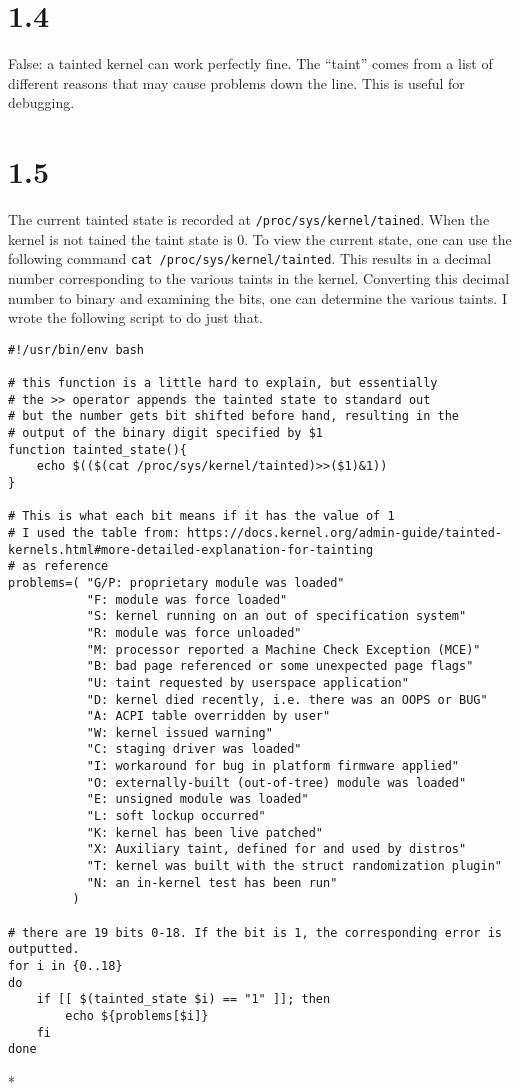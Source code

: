 \documentclass[11pt]{article}
\author{David Lewis}
\date{\today}
\title{}
\begin{document}
\tableofcontents

\section{1.4}
\label{sec:orgbec6297}
False: a tainted kernel can work perfectly fine. The ``taint'' comes from a list
of different reasons that may cause problems down the line. This is useful for debugging.
\section{1.5}
\label{sec:org8f94e1a}
The current tainted state is recorded at \texttt{/proc/sys/kernel/tained}. When the kernel
is not tained the taint state is 0. To view the current state, one can use the
following command \texttt{cat /proc/sys/kernel/tainted}. This results in a decimal number
corresponding to the various taints in the kernel. Converting this decimal
number to binary and examining the bits, one can determine the various taints. I
wrote the following script to do just that.

\begin{verbatim}
#!/usr/bin/env bash

# this function is a little hard to explain, but essentially
# the >> operator appends the tainted state to standard out
# but the number gets bit shifted before hand, resulting in the
# output of the binary digit specified by $1
function tainted_state(){
    echo $(($(cat /proc/sys/kernel/tainted)>>($1)&1))
}

# This is what each bit means if it has the value of 1
# I used the table from: https://docs.kernel.org/admin-guide/tainted-kernels.html#more-detailed-explanation-for-tainting
# as reference
problems=( "G/P: proprietary module was loaded"
           "F: module was force loaded"
           "S: kernel running on an out of specification system"
           "R: module was force unloaded"
           "M: processor reported a Machine Check Exception (MCE)"
           "B: bad page referenced or some unexpected page flags"
           "U: taint requested by userspace application"
           "D: kernel died recently, i.e. there was an OOPS or BUG"
           "A: ACPI table overridden by user"
           "W: kernel issued warning"
           "C: staging driver was loaded"
           "I: workaround for bug in platform firmware applied"
           "O: externally-built (out-of-tree) module was loaded"
           "E: unsigned module was loaded"
           "L: soft lockup occurred"
           "K: kernel has been live patched"
           "X: Auxiliary taint, defined for and used by distros"
           "T: kernel was built with the struct randomization plugin"
           "N: an in-kernel test has been run"
         )

# there are 19 bits 0-18. If the bit is 1, the corresponding error is outputted.
for i in {0..18}
do
    if [[ $(tainted_state $i) == "1" ]]; then
        echo ${problems[$i]}
    fi
done
\end{verbatim}
*
\end{document}
